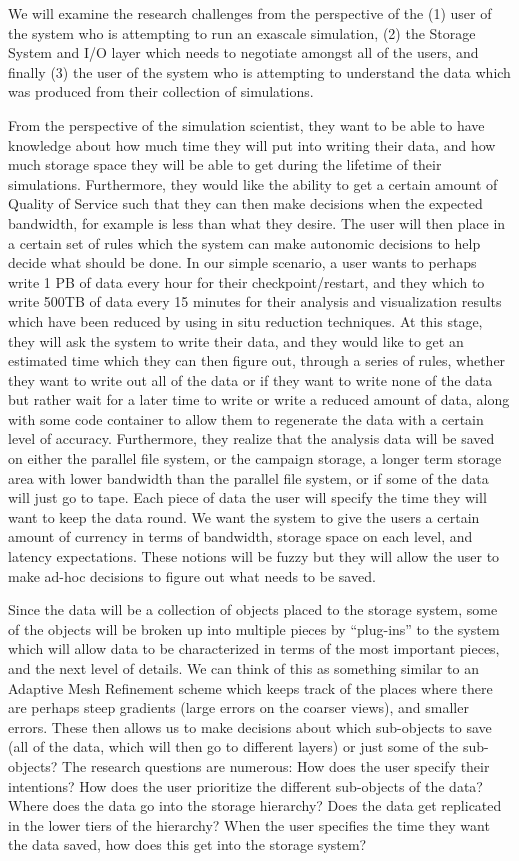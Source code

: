 We will examine the research challenges from the perspective of the (1) user of the system who is attempting to run an exascale simulation,
(2) the Storage System and I/O layer which needs to negotiate amongst all of the users, and finally (3) the user of the system who is attempting to
understand the data which was produced from their collection of simulations.

From the perspective of the simulation scientist, they want to be able to have knowledge about how much time they will 
put into writing their data, and how much storage space they will be able to get during the lifetime of their simulations. Furthermore, they
would like the ability to get a certain amount of Quality of Service such that they can then make decisions when the expected bandwidth, for example
is less than what they desire. The user will then place in a certain set of rules which the system can make autonomic decisions to help decide what
should be done. In our simple scenario, a user wants to perhaps write 1 PB of data every hour for their checkpoint/restart, and they which to write 500TB of data
every 15 minutes for their analysis and visualization results which have been reduced by using in situ reduction techniques. At this stage, they will ask the system
to write their data, and they would like to get an estimated time which they can then figure out, through a series of rules, whether they want to write out all of the
data or if they want to write none of the data but rather wait for a later time to write or write a reduced amount of data, along with some code container to allow them 
to regenerate the data with a certain level of accuracy. Furthermore, they realize that the analysis data will be saved on either the parallel file system, or the campaign storage,
a longer term storage area with lower bandwidth than the parallel file system, or if some of the data will just go to tape. Each piece of data the user will specify the
time they will want to keep the data round. We want the system to give the users a certain amount of currency in terms of bandwidth, storage space on each level, and latency expectations.
These notions will be fuzzy but they will allow the user to make ad-hoc decisions to figure out what needs to be saved.

Since the data will be a collection of objects placed to the storage system, some of the objects will be broken up into multiple pieces by ``plug-ins'' to the system
which will allow data to be characterized in terms of the most important pieces, and the next level of details. We can think of this as something similar to an Adaptive Mesh Refinement scheme
which keeps track of the places where there are perhaps steep gradients (large errors on the coarser views), and smaller errors.  These then allows us to make decisions about which 
sub-objects to save (all of the data, which will then go to different layers) or just some of the sub-objects?  The research questions are numerous: How does the user specify their intentions? 
How does the user prioritize the different sub-objects of the data? Where does the data go into the storage hierarchy? Does the data get replicated in the lower tiers of the hierarchy? 
When the user specifies the time they want the data saved, how does this get into the storage system?

